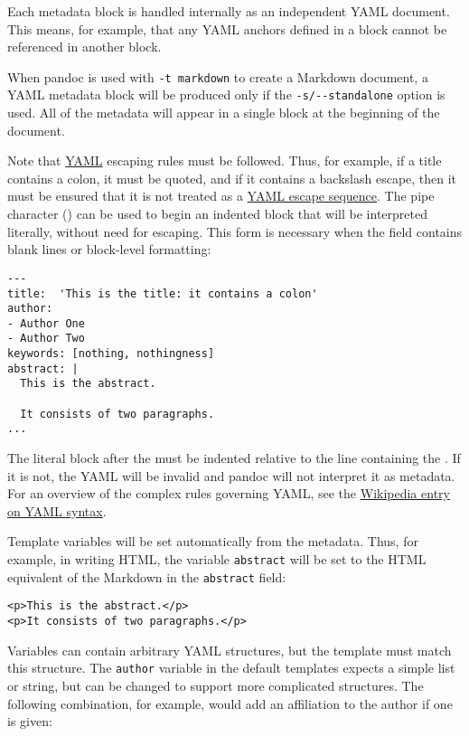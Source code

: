 \documentclass[
]{article}
\begin{document}
Each metadata block is handled internally as an independent YAML
document. This means, for example, that any YAML anchors defined in a
block cannot be referenced in another block.

When pandoc is used with \texttt{-t\ markdown} to create a Markdown
document, a YAML metadata block will be produced only if the
\texttt{-s/-\/-standalone} option is used. All of the metadata will
appear in a single block at the beginning of the document.

Note that \href{https://yaml.org/spec/1.2/spec.html}{YAML} escaping
rules must be followed. Thus, for example, if a title contains a colon,
it must be quoted, and if it contains a backslash escape, then it must
be ensured that it is not treated as a
\href{https://yaml.org/spec/1.2/spec.html\#id2776092}{YAML escape
sequence}. The pipe character (\texttt{\textbar{}}) can be used to begin
an indented block that will be interpreted literally, without need for
escaping. This form is necessary when the field contains blank lines or
block-level formatting:

\begin{verbatim}
---
title:  'This is the title: it contains a colon'
author:
- Author One
- Author Two
keywords: [nothing, nothingness]
abstract: |
  This is the abstract.

  It consists of two paragraphs.
...
\end{verbatim}

The literal block after the \texttt{\textbar{}} must be indented
relative to the line containing the \texttt{\textbar{}}. If it is not,
the YAML will be invalid and pandoc will not interpret it as metadata.
For an overview of the complex rules governing YAML, see the
\href{https://en.wikipedia.org/wiki/YAML\#Syntax}{Wikipedia entry on
YAML syntax}.

Template variables will be set automatically from the metadata. Thus,
for example, in writing HTML, the variable \texttt{abstract} will be set
to the HTML equivalent of the Markdown in the \texttt{abstract} field:

\begin{verbatim}
<p>This is the abstract.</p>
<p>It consists of two paragraphs.</p>
\end{verbatim}

Variables can contain arbitrary YAML structures, but the template must
match this structure. The \texttt{author} variable in the default
templates expects a simple list or string, but can be changed to support
more complicated structures. The following combination, for example,
would add an affiliation to the author if one is given:
\end{document}
